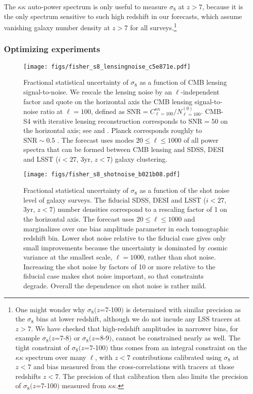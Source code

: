 \documentclass[prd,superscriptaddress,floatfix,notitlepage,nofootinbib,reprint]{revtex4-1} %
\begin{document}
The $\kappa\kappa$ auto-power spectrum is only useful to measure $\sigma_8$ at $z>7$, because it is the only spectrum sensitive to such high redshift in our forecasts, which assume vanishing galaxy number density at $z>7$ for all surveys.\footnote{One might wonder why $\sigma_8(z$=7-100$)$ is determined with similar precision as the $\sigma_8$ bins at lower redshift, although we do not incude any LSS tracers at $z>7$.
We have checked that high-redshift amplitudes in narrower bins, for example $\sigma_8(z$=7-8$)$ or $\sigma_8(z$=8-9$)$, cannot be constrained nearly as well.
The tight constraint of $\sigma_8(z$=7-100$)$ thus comes from an integral constraint on the $\kappa\kappa$ spectrum over many $\ell$, with $z<7$ contributions calibrated using $\sigma_8$ at $z<7$ and bias measured from the cross-correlations with tracers at those redshifts $z<7$.
The precision of that calibration then also limits the precision of $\sigma_8(z$=7-100$)$   measured from $\kappa\kappa$.
}


\subsubsection{Optimizing experiments}

\begin{figure}[tbp]
\texttt{[image: figs/fisher\_s8\_lensingnoise\_c5e871e.pdf]}
\caption{Fractional statistical uncertainty of $\sigma_8$ as a function of CMB lensing signal-to-noise.
We rescale the lensing noise by an $\ell$-independent factor and quote on the horizontal axis the CMB lensing signal-to-noise ratio at $\ell=100$, defined as $\mathrm{SNR}=C^{\kappa\kappa}_{\ell=100}/N^{(0)}_{\ell=100}$.
CMB-S4 with iterative lensing reconstruction corresponds to $\mathrm{SNR}=50$ on the horizontal axis; see \cite{CMBS4SciBook} and .
Planck corresponds roughly to $\mathrm{SNR}\sim 0.5$ \cite{PlanckLensing2015}.
The forecast uses modes $20\le \ell\le 1000$ of all power spectra that can be formed between CMB lensing and SDSS, DESI and LSST ($i<27$, 3yr, $z<7$) galaxy clustering. 
}
\label{fig:s8_lensingnoise}
\end{figure}


\begin{figure}[tbp]
\texttt{[image: figs/fisher\_s8\_shotnoise\_b021b08.pdf]}
\caption{Fractional statistical uncertainty of $\sigma_8$ as a function of the shot noise level of galaxy surveys.
The fiducial SDSS, DESI and LSST ($i<27$, 3yr, $z<7$) number densities correspond to a rescaling factor of 1 on the horizontal axis.
The forecast uses $20\le\ell\le 1000$ and marginalizes over one bias amplitude parameter in each tomographic redshift bin.
Lower shot noise relative to the fiducial case gives only small improvements because the uncertainty is dominated by cosmic variance at the smallest scale, $\ell=1000$, rather than shot noise.
Increasing the shot noise by factors of 10 or more relative to the fiducial case makes shot noise important, so that constraints degrade.
Overall the dependence on shot noise is rather mild.
}
\label{fig:s8_shotnoise}
\end{figure}
\end{document}
